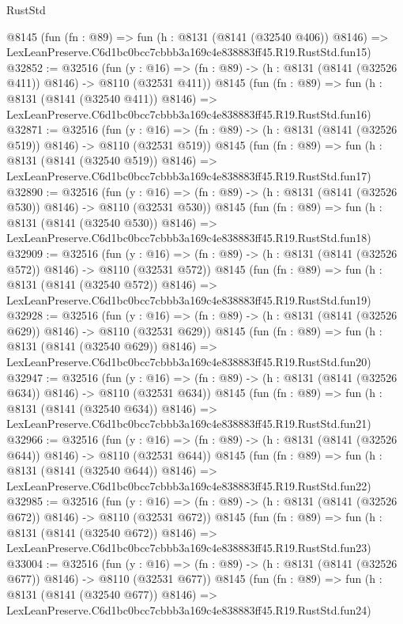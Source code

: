 \begin{lexlean}{RustStd}
\begin{coremodule}
    @8145
    (fun (fn : @89) =>
    fun (h : @8131 (@8141 (@32540 @406)) @8146) =>
    LexLeanPreserve.C6d1bc0bcc7cbbb3a169c4e838883ff45.R19.RustStd.fun15)
@32852 := @32516
    (fun (y : @16) => (fn : @89) -> (h : @8131 (@8141 (@32526 @411)) @8146) -> @8110 (@32531 @411))
    @8145
    (fun (fn : @89) =>
    fun (h : @8131 (@8141 (@32540 @411)) @8146) =>
    LexLeanPreserve.C6d1bc0bcc7cbbb3a169c4e838883ff45.R19.RustStd.fun16)
@32871 := @32516
    (fun (y : @16) => (fn : @89) -> (h : @8131 (@8141 (@32526 @519)) @8146) -> @8110 (@32531 @519))
    @8145
    (fun (fn : @89) =>
    fun (h : @8131 (@8141 (@32540 @519)) @8146) =>
    LexLeanPreserve.C6d1bc0bcc7cbbb3a169c4e838883ff45.R19.RustStd.fun17)
@32890 := @32516
    (fun (y : @16) => (fn : @89) -> (h : @8131 (@8141 (@32526 @530)) @8146) -> @8110 (@32531 @530))
    @8145
    (fun (fn : @89) =>
    fun (h : @8131 (@8141 (@32540 @530)) @8146) =>
    LexLeanPreserve.C6d1bc0bcc7cbbb3a169c4e838883ff45.R19.RustStd.fun18)
@32909 := @32516
    (fun (y : @16) => (fn : @89) -> (h : @8131 (@8141 (@32526 @572)) @8146) -> @8110 (@32531 @572))
    @8145
    (fun (fn : @89) =>
    fun (h : @8131 (@8141 (@32540 @572)) @8146) =>
    LexLeanPreserve.C6d1bc0bcc7cbbb3a169c4e838883ff45.R19.RustStd.fun19)
@32928 := @32516
    (fun (y : @16) => (fn : @89) -> (h : @8131 (@8141 (@32526 @629)) @8146) -> @8110 (@32531 @629))
    @8145
    (fun (fn : @89) =>
    fun (h : @8131 (@8141 (@32540 @629)) @8146) =>
    LexLeanPreserve.C6d1bc0bcc7cbbb3a169c4e838883ff45.R19.RustStd.fun20)
@32947 := @32516
    (fun (y : @16) => (fn : @89) -> (h : @8131 (@8141 (@32526 @634)) @8146) -> @8110 (@32531 @634))
    @8145
    (fun (fn : @89) =>
    fun (h : @8131 (@8141 (@32540 @634)) @8146) =>
    LexLeanPreserve.C6d1bc0bcc7cbbb3a169c4e838883ff45.R19.RustStd.fun21)
@32966 := @32516
    (fun (y : @16) => (fn : @89) -> (h : @8131 (@8141 (@32526 @644)) @8146) -> @8110 (@32531 @644))
    @8145
    (fun (fn : @89) =>
    fun (h : @8131 (@8141 (@32540 @644)) @8146) =>
    LexLeanPreserve.C6d1bc0bcc7cbbb3a169c4e838883ff45.R19.RustStd.fun22)
@32985 := @32516
    (fun (y : @16) => (fn : @89) -> (h : @8131 (@8141 (@32526 @672)) @8146) -> @8110 (@32531 @672))
    @8145
    (fun (fn : @89) =>
    fun (h : @8131 (@8141 (@32540 @672)) @8146) =>
    LexLeanPreserve.C6d1bc0bcc7cbbb3a169c4e838883ff45.R19.RustStd.fun23)
@33004 := @32516
    (fun (y : @16) => (fn : @89) -> (h : @8131 (@8141 (@32526 @677)) @8146) -> @8110 (@32531 @677))
    @8145
    (fun (fn : @89) =>
    fun (h : @8131 (@8141 (@32540 @677)) @8146) =>
    LexLeanPreserve.C6d1bc0bcc7cbbb3a169c4e838883ff45.R19.RustStd.fun24)

\end{coremodule}
\end{lexlean}
